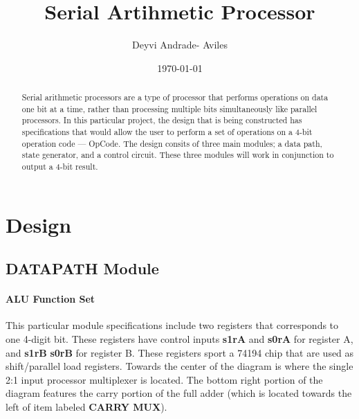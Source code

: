 \documentclass[11pt,a4paper,english]{article}
\author{Deyvi Andrade- Aviles}
\date{\today}
\begin{document}
\providecommand{\ShortAuthorList}[0]{A.~M.~Surname, B.~D.~Suffix Jr., C.~G. Suffix III} %
\title{Serial Artihmetic Processor}

\date{}
\begin{abstract}
\noindent
Serial arithmetic processors are a type of processor that performs operations on data one bit at a time, rather than processing multiple bits simultaneously like parallel processors. In this particular project, the design that is being constructed has specifications that would allow the user to perform a set of operations on a 4-bit operation code --- OpCode. The design consits of three main modules; a data path, state generator, and a control circuit. These three modules will work in conjunction to output a 4-bit result.


\DOI{} %
\end{abstract}

\maketitle
\thispagestyle{titlestyle}

\pagebreak

\section{Design}
\vspace*{10pt}
 \subsection*{DATAPATH Module}
 \paragraph*{ALU Function Set}This particular module specifications include two registers that corresponds to one 4-digit bit. These registers have control inputs \textbf{s1rA} and \textbf{s0rA} for register A, and \textbf{s1rB} \textbf{s0rB} for register B. These registers sport a 74194 chip that are used as shift/parallel load registers. Towards the center of the diagram is where the single 2:1 input processor multiplexer is located. The bottom right portion of the diagram features the carry portion of the full adder (which is located towards the left of item labeled \textbf{CARRY MUX}).
\end{document}

